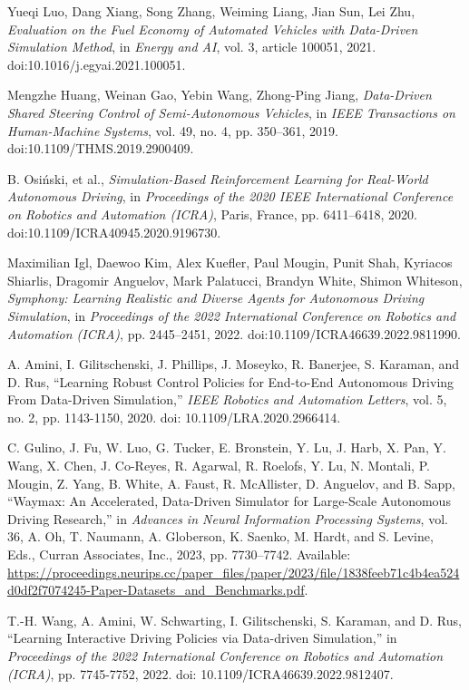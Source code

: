 \documentclass[lettersize,journal]{IEEEtran}
\begin{document}
\begin{thebibliography}{1}
Yueqi Luo, Dang Xiang, Song Zhang, Weiming Liang, Jian Sun, Lei Zhu,
\textit{Evaluation on the Fuel Economy of Automated Vehicles with Data-Driven Simulation Method}, in \textit{Energy and AI}, vol. 3, article 100051, 2021.
doi:10.1016/j.egyai.2021.100051.


Mengzhe Huang, Weinan Gao, Yebin Wang, Zhong-Ping Jiang,
\textit{Data-Driven Shared Steering Control of Semi-Autonomous Vehicles}, in \textit{IEEE Transactions on Human-Machine Systems}, vol. 49, no. 4, pp. 350--361, 2019.
doi:10.1109/THMS.2019.2900409.

B. Osiński, et al.,
\textit{Simulation-Based Reinforcement Learning for Real-World Autonomous Driving}, in \textit{Proceedings of the 2020 IEEE International Conference on Robotics and Automation (ICRA)}, Paris, France, pp. 6411--6418, 2020.
doi:10.1109/ICRA40945.2020.9196730.


Maximilian Igl, Daewoo Kim, Alex Kuefler, Paul Mougin, Punit Shah, Kyriacos Shiarlis, Dragomir Anguelov, Mark Palatucci, Brandyn White, Shimon Whiteson,
\textit{Symphony: Learning Realistic and Diverse Agents for Autonomous Driving Simulation}, in \textit{Proceedings of the 2022 International Conference on Robotics and Automation (ICRA)}, pp. 2445--2451, 2022.
doi:10.1109/ICRA46639.2022.9811990.


A. Amini, I. Gilitschenski, J. Phillips, J. Moseyko, R. Banerjee, S. Karaman, and D. Rus, ``Learning Robust Control Policies for End-to-End Autonomous Driving From Data-Driven Simulation,'' \textit{IEEE Robotics and Automation Letters}, vol. 5, no. 2, pp. 1143-1150, 2020. doi: 10.1109/LRA.2020.2966414.

C. Gulino, J. Fu, W. Luo, G. Tucker, E. Bronstein, Y. Lu, J. Harb, X. Pan, Y. Wang, X. Chen, J. Co-Reyes, R. Agarwal, R. Roelofs, Y. Lu, N. Montali, P. Mougin, Z. Yang, B. White, A. Faust, R. McAllister, D. Anguelov, and B. Sapp, ``Waymax: An Accelerated, Data-Driven Simulator for Large-Scale Autonomous Driving Research,'' in \textit{Advances in Neural Information Processing Systems}, vol. 36, A. Oh, T. Naumann, A. Globerson, K. Saenko, M. Hardt, and S. Levine, Eds., Curran Associates, Inc., 2023, pp. 7730--7742. Available: \url{https://proceedings.neurips.cc/paper_files/paper/2023/file/1838feeb71c4b4ea524d0df2f7074245-Paper-Datasets_and_Benchmarks.pdf}.

T.-H. Wang, A. Amini, W. Schwarting, I. Gilitschenski, S. Karaman, and D. Rus, ``Learning Interactive Driving Policies via Data-driven Simulation,'' in \textit{Proceedings of the 2022 International Conference on Robotics and Automation (ICRA)}, pp. 7745-7752, 2022. doi: 10.1109/ICRA46639.2022.9812407.


\end{thebibliography}
\end{document}
